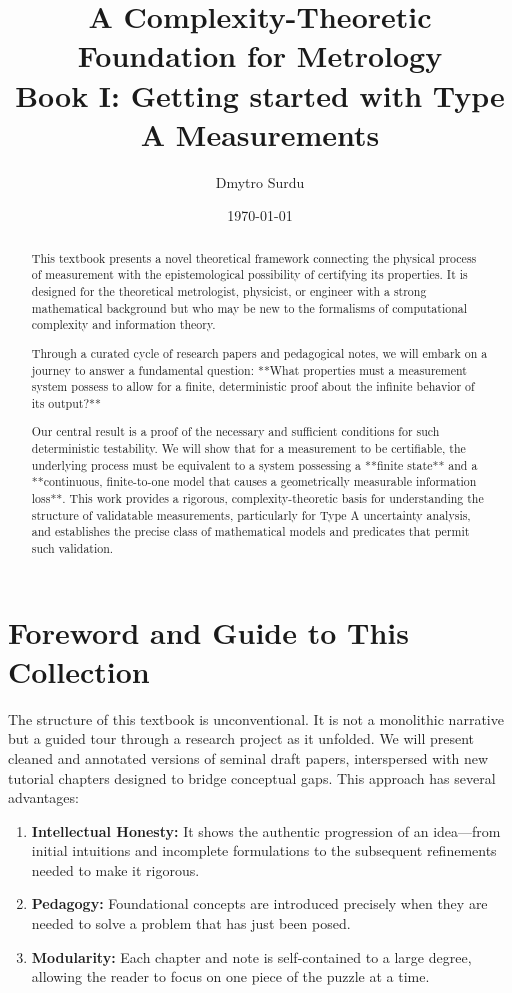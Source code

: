 \documentclass[12pt]{article}
\title{\textbf{A Complexity-Theoretic Foundation for Metrology \\ \large Book I: Getting started with Type A Measurements}}
\author{Dmytro Surdu}
\date{\today}
\begin{document}
\maketitle

\begin{abstract}
\noindent This textbook presents a novel theoretical framework connecting the physical process of measurement with the epistemological possibility of certifying its properties. It is designed for the theoretical metrologist, physicist, or engineer with a strong mathematical background but who may be new to the formalisms of computational complexity and information theory.

Through a curated cycle of research papers and pedagogical notes, we will embark on a journey to answer a fundamental question: **What properties must a measurement system possess to allow for a finite, deterministic proof about the infinite behavior of its output?**

Our central result is a proof of the necessary and sufficient conditions for such deterministic testability. We will show that for a measurement to be certifiable, the underlying process must be equivalent to a system possessing a **finite state** and a **continuous, finite-to-one model that causes a geometrically measurable information loss**. This work provides a rigorous, complexity-theoretic basis for understanding the structure of validatable measurements, particularly for Type A uncertainty analysis, and establishes the precise class of mathematical models and predicates that permit such validation.
\end{abstract}

\section*{Foreword and Guide to This Collection}

The structure of this textbook is unconventional. It is not a monolithic narrative but a guided tour through a research project as it unfolded. We will present cleaned and annotated versions of seminal draft papers, interspersed with new tutorial chapters designed to bridge conceptual gaps. This approach has several advantages:

\begin{enumerate}
    \item \textbf{Intellectual Honesty:} It shows the authentic progression of an idea—from initial intuitions and incomplete formulations to the subsequent refinements needed to make it rigorous.
    \item \textbf{Pedagogy:} Foundational concepts are introduced precisely when they are needed to solve a problem that has just been posed.
    \item \textbf{Modularity:} Each chapter and note is self-contained to a large degree, allowing the reader to focus on one piece of the puzzle at a time.
\end{enumerate}
\end{document}
